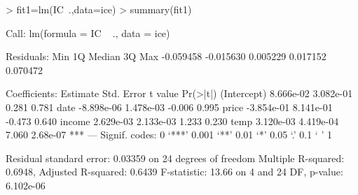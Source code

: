 \documentclass[12pt]{article}
\begin{document}
\begin{itemize}
\begin{Schunk}
\begin{Sinput}
> fit1=lm(IC~.,data=ice)
> summary(fit1)
\end{Sinput}
\begin{Soutput}
Call:
lm(formula = IC ~ ., data = ice)

Residuals:
      Min        1Q    Median        3Q       Max 
-0.059458 -0.015630  0.005229  0.017152  0.070472 

Coefficients:
              Estimate Std. Error t value Pr(>|t|)    
(Intercept)  8.666e-02  3.082e-01   0.281    0.781    
date        -8.898e-06  1.478e-03  -0.006    0.995    
price       -3.854e-01  8.141e-01  -0.473    0.640    
income       2.629e-03  2.133e-03   1.233    0.230    
temp         3.120e-03  4.419e-04   7.060 2.68e-07 ***
---
Signif. codes:  0 ‘***’ 0.001 ‘**’ 0.01 ‘*’ 0.05 ‘.’ 0.1 ‘ ’ 1 

Residual standard error: 0.03359 on 24 degrees of freedom
Multiple R-squared: 0.6948,	Adjusted R-squared: 0.6439 
F-statistic: 13.66 on 4 and 24 DF,  p-value: 6.102e-06 
\end{Soutput}
\end{Schunk}


\end{itemize}
\end{document}
